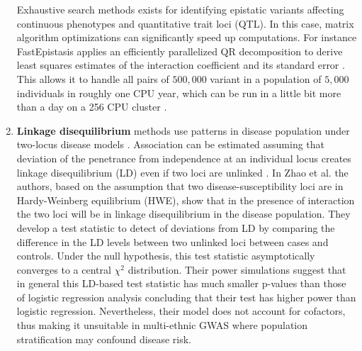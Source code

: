 \begin{enumerate}
Exhaustive search methods exists for identifying epistatic variants affecting continuous phenotypes and quantitative trait loci (QTL).
In this case, matrix algorithm optimizations can significantly speed up computations.
For instance FastEpistasis applies an efficiently parallelized QR decomposition to derive least squares estimates of the interaction coefficient and its standard error \cite{schupbach2010fastepistasis}.
This allows it to handle all pairs of $500,000$ variant in a population of $5,000$ individuals in roughly one CPU year, which can be run in a little bit more than a day on a 256 CPU cluster \cite{schupbach2010fastepistasis}.

	\item \textbf{Linkage disequilibrium} methods use patterns in disease population under two-locus disease models \cite{zhao2006test}.
	Association can be estimated assuming that deviation of the penetrance from independence at an individual locus creates linkage disequilibrium (LD) even if two loci are unlinked \cite{zhao2006test}.
In Zhao et al. \cite{zhao2006test} the authors, based on the assumption that two disease-susceptibility loci are in Hardy-Weinberg equilibrium (HWE), show that in the presence of interaction the two loci will be in linkage disequilibrium in the disease population.
They develop a test statistic to detect of deviations from LD by comparing the difference in the LD levels between two unlinked loci between cases and controls.
Under the null hypothesis, this test statistic asymptotically converges to a central $\chi^2$ distribution.
Their power simulations suggest that in general this LD-based test statistic has much smaller p-values than those of logistic regression analysis concluding that their test has higher power than logistic regression.
Nevertheless, their model does not account for cofactors, thus making it unsuitable in multi-ethnic GWAS where population stratification may confound disease risk.


\end{enumerate}
